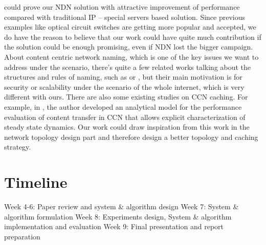 \documentclass[journal]{IEEEtran}
\begin{document}
could prove our NDN solution with attractive improvement of 
performance compared with traditional IP – special servers based 
solution. Since previous examples like optical circuit switches are 
getting more popular and accepted, we do have the reason to believe 
that our work could have quite much contribution if the solution could 
be enough promising, even if NDN lost the bigger campaign. 
About content centric network naming, which is one of the key issues 
we want to address under the scenario, there’s quite a few related 
works talking about the structures and rules of naming, such as \cite{ghodsi2011naming} or 
\cite{primes}, but their main motivation is for security or scalability under 
the scenario of the whole internet, which is very different with 
ours. 
There are also some existing studies on CCN caching. For example, in 
\cite{carofiglio2011modeling}, the author developed an analytical model for the performance 
evaluation of content transfer in CCN that allows explicit 
characterization of steady state dynamics. Our work could draw 
inspiration from this work in the network topology design part and 
therefore design a better topology and caching strategy. 

\section{Timeline}
Week 4-6: Paper review and system \& algorithm design 
Week 7:  System \& algorithm formulation 
Week 8: Experiments design, System \& algorithm implementation and 
evaluation 
Week 9: Final presentation and report preparation 





\end{document}

